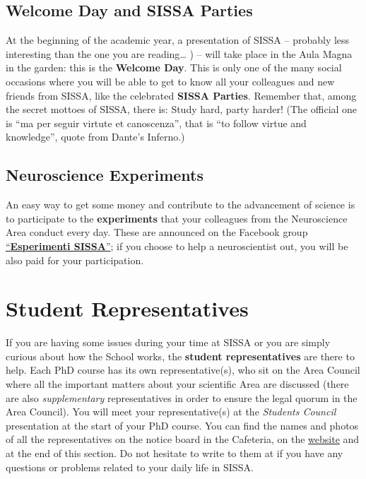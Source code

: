 \documentclass{sissavademecum}
\begin{document}
\section{Welcome Day and SISSA Parties}

At the beginning of the academic year, a presentation of SISSA -- probably less interesting than the one you are reading{\dots} ) -- will take place in the Aula Magna in the garden: this is the \textbf{Welcome Day}. This is only one of the many social occasions where you will be able to get to know all your colleagues and new friends from SISSA, like the celebrated \textbf{SISSA Parties}. Remember that, among the secret mottoes of SISSA, there is: Study hard, party harder! (The official one is ``ma per seguir virtute et canoscenza'', that is ``to follow virtue and knowledge'', quote from Dante's Inferno.) 


\section{Neuroscience Experiments}

An easy way to get some money and contribute to the advancement of science is to participate to the \textbf{experiments} that your colleagues from the Neuroscience Area conduct every day. These are announced on the Facebook group \href{https://www.facebook.com/groups/144096472323480}{``\textbf{Esperimenti SISSA}{}''}; if you choose to help a neuroscientist out, you will be also paid for your participation. 


\chapter{Student Representatives}

If you are having some issues during your time at SISSA or you are simply curious about how the School works, the \textbf{student representatives} are there to help. Each PhD course has its own representative(s), who sit on the Area Council where all the important matters about your scientific Area are discussed (there are also \textit{supplementary} representatives in order to ensure the legal quorum in the Area Council). You will meet your representative(s) at the \emph{Students Council} presentation at the start of your PhD course. You can find the names and photos of all the representatives on the notice board in the Cafeteria, on the \href{http://students.sissa.it/}{website} and at the end of this section. Do not hesitate to write to them at  if you have any questions or problems related to your daily life in SISSA.
\end{document}
